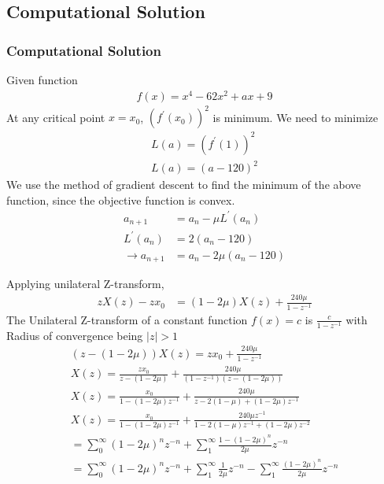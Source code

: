 \documentclass{beamer}
\providecommand{\brak}[1]{\ensuremath{\left(#1\right)}}
\theoremstyle{remark}
\providecommand{\abs}[1]{\left\vert#1\right\vert}
\numberwithin{equation}{section}
\begin{document}
\subsection{Computational Solution}
\begin{frame}
\frametitle{Computational Solution}
Given function
\begin{align}
	f\brak{x} = x^4 - 62x^2 + ax + 9
\end{align}
At any critical point $x=x_0$, $\brak{f^\prime\brak{x_0}}^2$ is minimum. We need to minimize
\begin{align}
L\brak{a} = \brak{f^\prime\brak{1}}^2\\
L\brak{a} = \brak{a-120}^2
\end{align}
We use the method of gradient descent to find the minimum of the above function, since the objective function is convex.
\begin{align}
    a_{n+1} &= a_n - \mu L^{\prime}\brak{a_n}\\
    L^{\prime}\brak{a_n} &= 2\brak{a_n-120}\\
    \xrightarrow{} a_{n+1} &= a_n - 2\mu\brak{a_n-120}
\end{align}
\end{frame}
\begin{frame}
Applying unilateral Z-transform,
\begin{align}
    zX\brak{z} - zx_0 &= \brak{1-2\mu}X\brak{z}+\frac{240\mu}{1-z^{-1}}
\end{align}
The Unilateral Z-transform of a constant function $f\brak{x} = c$ is $\frac{c}{1-z^{-1}}$ with Radius of convergence being $\abs{z}>1$
\begin{align}
    \brak{z - \brak{1-2\mu}}X\brak{z} = zx_0+\frac{240\mu}{1-z^{-1}}\\
    X\brak{z} = \frac{zx_0}{z - \brak{1-2\mu}}+\frac{240\mu}{\brak{1-z^{-1}}\brak{z - \brak{1-2\mu}}}\\
    X\brak{z} = \frac{x_0}{1 - \brak{1-2\mu}z^{-1}}+\frac{240\mu}{z-2\brak{1-\mu}+\brak{1-2\mu}z^{-1}}\\
    X\brak{z} = \frac{x_0}{1 - \brak{1-2\mu}z^{-1}}+\frac{240\mu z^{-1}}{1-2\brak{1-\mu}z^{-1}+\brak{1-2\mu}z^{-2}}\\
    = \sum_{0}^{\infty} \brak{1-2\mu}^n z^{-n}+\sum_{1}^{\infty}\frac{1-\brak{1-2\mu}^n}{2\mu}z^{-n}\\
    = \sum_{0}^{\infty} \brak{1-2\mu}^n z^{-n}+\sum_{1}^{\infty}\frac{1}{2\mu}z^{-n}-\sum_{1}^{\infty}\frac{\brak{1-2\mu}^n}{2\mu}z^{-n}\\
\end{align}
\end{frame}
\end{document}
